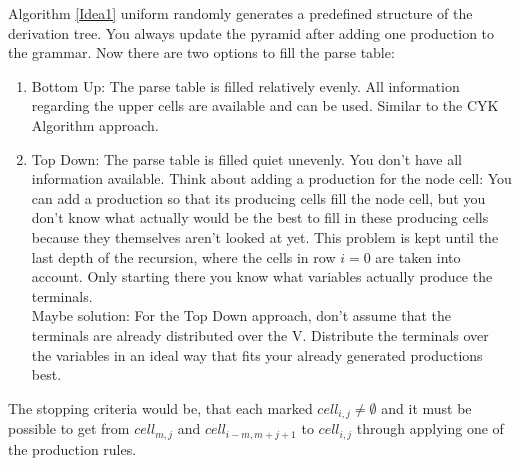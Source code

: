 \noindent
{}
Algorithm \ref{Idea1} uniform randomly generates a predefined structure of the derivation tree. You always update the pyramid after adding one production to the grammar. Now there are two options to fill the parse table:
\begin{enumerate}
	\item Bottom Up: The parse table is filled relatively evenly. All information regarding the upper cells are available and can be used. Similar to the CYK Algorithm approach.
	\item Top Down: The parse table is filled quiet unevenly. You don't have all information available. Think about adding a production for the node cell: You can add a production so that its producing cells fill the node cell, but you don't know what actually would be the best to fill in these producing cells because they themselves aren't looked at yet. This problem is kept until the last depth of the recursion, where the cells in row $i=0$ are taken into account. Only starting there you know what variables actually produce the terminals.\\
	Maybe solution: For the Top Down approach, don't assume that the terminals are already distributed over the V. Distribute the terminals over the variables in an ideal way that fits your already generated productions best.
\end{enumerate}
The stopping criteria would be, that each marked $cell_{i,j} \neq \emptyset$ and it must be possible to get from $cell_{m, j}$ and $cell_{i-m, m+j+1}$ to $cell_{i,j}$ through applying one of the production rules.

